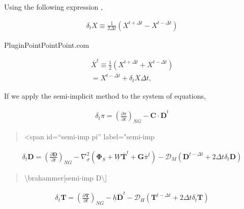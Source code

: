 Using the following expression ,

\begin{eqnarray}
  \delta_{t} {X} \equiv \frac{1}{2 \Delta t}
        \left( {X}^{t+\Delta t} - {X}^{t-\Delta t} \right)
\end{eqnarray}

PluginPointPointPoint.com

\begin{eqnarray}
    \overline{X}^{t}
   \equiv  \frac{1}{2} \left( {X}^{t+\Delta t}
                              + {X}^{t-\Delta t} \right)
         \\
   =  {X}^{t-\Delta t} + \delta_{t} {X} \Delta t   ,
\end{eqnarray}

If we apply the semi-implicit method to the system of equations,

\begin{eqnarray}
  \delta_{t} \pi =
          \left( \frac{\partial \pi}{\partial t} \right)_{NG}  
     - \mathbf{C} \cdot \overline{ \mathbf{D} }^{t}
\end{eqnarray}

\begin{quote}
\textless span id=``semi-imp pi'' label="semi-imp
\end{quote}

\begin{eqnarray}
  \delta_{t} \mathbf{D} =
          \left( \frac{\partial \mathbf{D}}{\partial t} \right)_{NG}  
          - \nabla^{2}_{\sigma} ( \mathbf{\Phi}_{S}
                                  + \underline{W}
                                     \overline{ \mathbf{T} }^{t}
                                  + \mathbf{G}
                                  \overline{\pi}^{t} )
          - {\mathcal D}_M ( \mathbf{D}^{t-\Delta t}
                         + 2 \Delta t \delta_{t} \mathbf{D} )
\end{eqnarray}

\begin{quote}
\protect\hypertarget{semi-impux20D}{}{\textbackslash brahammer{[}semi-imp
D\textbackslash{]}}
\end{quote}

\begin{eqnarray}
  \delta_{t} \mathbf{T} =
        \left( \frac{\partial \mathbf{T}}{\partial t} \right)_{NG}  
         - \underline{h} \overline{ \mathbf{D} }^{t}
         - {\mathcal D}_H ( \mathbf{T}^{t-\Delta t}
                        + 2 \Delta t \delta_{t} \mathbf{T} )
\end{eqnarray}

